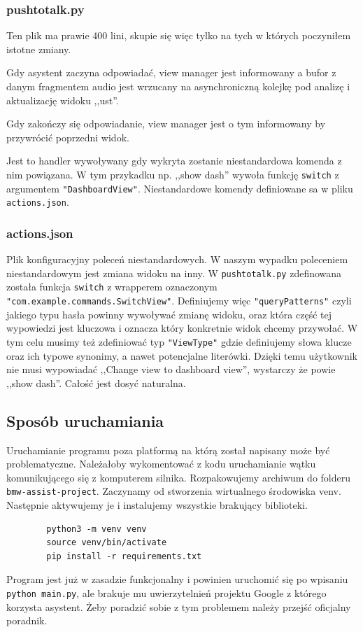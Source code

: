\documentclass[declaration,shortabstract, inz]{iithesis}
\begin{document}
\subsubsection{pushtotalk.py}
Ten plik ma prawie 400 lini, skupie się więc tylko na tych w których poczyniłem istotne zmiany.

    Gdy asystent zaczyna odpowiadać, view manager jest informowany a bufor z danym fragmentem audio jest wrzucany na asynchroniczną kolejkę pod analizę i aktualizację widoku ,,ust''.

    Gdy zakończy się odpowiadanie, view manager jest o tym informowany by przywrócić poprzedni widok.

    Jest to handler wywoływany gdy wykryta zostanie niestandardowa komenda z nim powiązana. W tym przykadku np. ,,show dash'' wywoła funkcję \texttt{switch} z argumentem \texttt{"DashboardView"}. Niestandardowe komendy definiowane sa w pliku \texttt{actions.json}.



\subsubsection{actions.json}
% 
    Plik konfiguracyjny poleceń niestandardowych. W naszym wypadku poleceniem niestandardowym jest zmiana widoku na inny. W \texttt{pushtotalk.py} zdefinowana została funkcja \texttt{switch} z wrapperem oznaczonym \texttt{"com.example.commands.SwitchView"}. Definiujemy więc \texttt{"queryPatterns"} czyli jakiego typu hasła powinny wywoływać zmianę widoku, oraz która część tej wypowiedzi jest kluczowa i oznacza który konkretnie widok chcemy przywołać. W tym celu musimy też zdefiniować typ \texttt{"ViewType"} gdzie definiujemy słowa klucze oraz ich typowe synonimy, a nawet potencjalne literówki. Dzięki temu użytkownik nie musi wypowiadać ,,Change view to dashboard view'', wystarczy że powie ,,show dash''. Całość jest dosyć naturalna.
    
\subsection{Sposób uruchamiania}
    Uruchamianie programu poza platformą na którą został napisany może być problematyczne.
    Należałoby wykomentować z kodu uruchamianie wątku komunikującego się z komputerem silnika.
    Rozpakowujemy archiwum do folderu \texttt{bmw-assist-project}. Zaczynamy od stworzenia wirtualnego środowiska venv. Następnie aktywujemy je i instalujemy wszystkie brakujący biblioteki.
    \begin{verbatim}
        python3 -m venv venv
        source venv/bin/activate
        pip install -r requirements.txt
    \end{verbatim}
    Program jest już w zasadzie funkcjonalny i powinien uruchomić się po wpisaniu \texttt{python main.py}, ale brakuje mu uwierzytelnień projektu Google z którego korzysta asystent. Żeby poradzić sobie z tym problemem należy przejść oficjalny poradnik\cite{samouczek}.
    
\end{document}
